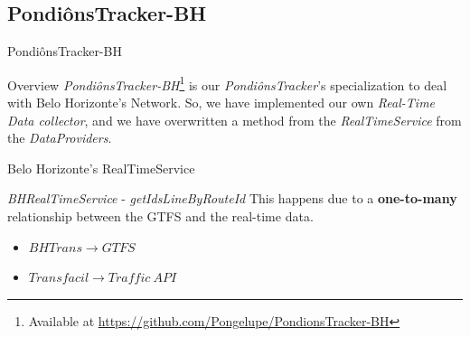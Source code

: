 \documentclass[xcolor=dvipsnames,table]{beamer}
\begin{document}
\subsection{PondiônsTracker-BH}
\begin{frame}{PondiônsTracker-BH}
        \begin{block}{Overview}
                \textit{PondiônsTracker-BH}\footnote{Available at \url{https://github.com/Pongelupe/PondionsTracker-BH}} is our \textit{PondiônsTracker}'s specialization to
                deal with Belo Horizonte's  Network. So, we have implemented our own \textit{Real-Time Data collector}, and we have overwritten a method from the \textit{RealTimeService} from the \textit{DataProviders}.
        \end{block}
\end{frame}
\begin{frame}{Belo Horizonte’s RealTimeService}
        \begin{block}{\textit{BHRealTimeService} - \textit{getIdsLineByRouteId}}
                This happens due to a  \textbf{one-to-many} relationship between the GTFS and the real-time data.
                \begin{itemize}
                        \item $BHTrans \rightarrow GTFS$
                        \item $Transfacil \rightarrow Traffic\ API$
                \end{itemize}
        \end{block}
\end{frame}
\end{document}
